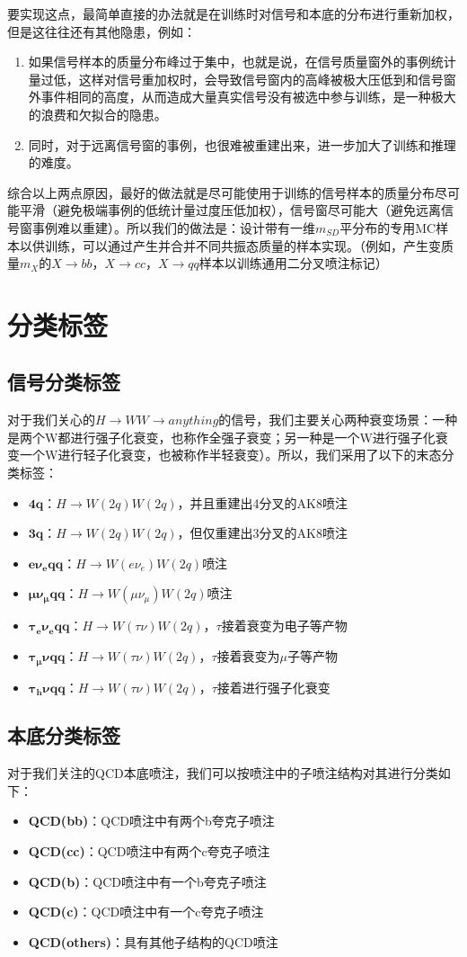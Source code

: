 要实现这点，最简单直接的办法就是在训练时对信号和本底的分布进行重新加权，但是这往往还有其他隐患，例如：
\begin{enumerate}[(1)]
    \item 如果信号样本的质量分布峰过于集中，也就是说，在信号质量窗外的事例统计量过低，这样对信号重加权时，会导致信号窗内的高峰被极大压低到和信号窗外事件相同的高度，从而造成大量真实信号没有被选中参与训练，是一种极大的浪费和欠拟合的隐患。
    \item 同时，对于远离信号窗的事例，也很难被重建出来，进一步加大了训练和推理的难度。
\end{enumerate}
综合以上两点原因，最好的做法就是尽可能使用于训练的信号样本的质量分布尽可能平滑（避免极端事例的低统计量过度压低加权），信号窗尽可能大（避免远离信号窗事例难以重建）。所以我们的做法是：设计带有一维$ m_{SD}$平分布的专用MC样本以供训练，可以通过产生并合并不同共振态质量的样本实现。（例如，产生变质量$m_X$的$X\to bb$，$X\to cc$，$X\to qq$样本以训练通用二分叉喷注标记）

\section{分类标签}
\subsection{信号分类标签}
对于我们关心的$H\to WW\to anything$的信号，我们主要关心两种衰变场景：一种是两个W都进行强子化衰变，也称作全强子衰变；另一种是一个W进行强子化衰变一个W进行轻子化衰变，也被称作半轻衰变）。所以，我们采用了以下的末态分类标签：
\begin{itemize}
    \item $\mathbf{4q}$：$H\to W(2q)W(2q)$，并且重建出4分叉的AK8喷注
    \item $\mathbf{3q}$：$H\to W(2q)W(2q)$，但仅重建出3分叉的AK8喷注
    \item $\mathbf{e\nu_e qq}$：$H\to W(e\nu_e)W(2q)$喷注
    \item $\mathbf{\mu\nu_\mu qq}$：$H\to W(\mu\nu_\mu)W(2q)$喷注
    \item $\mathbf{\tau_e\nu_eqq}$：$H\to W(\tau\nu)W(2q)$，$\tau$接着衰变为电子等产物
    \item $\bm{\tau_\mu\nu qq}$：$H\to W(\tau\nu)W(2q)$，$\tau$接着衰变为$\mu$子等产物
    \item $\mathbf{\tau_h\nu qq}$：$H\to W(\tau\nu)W(2q)$，$\tau$接着进行强子化衰变
\end{itemize}
\subsection{本底分类标签}
对于我们关注的QCD本底喷注，我们可以按喷注中的子喷注结构对其进行分类如下：
\begin{itemize}\label{eq:5.2}
    \item \textbf{QCD(bb)}：QCD喷注中有两个b夸克子喷注
    \item \textbf{QCD(cc)}：QCD喷注中有两个c夸克子喷注
    \item \textbf{QCD(b)}：QCD喷注中有一个b夸克子喷注
    \item \textbf{QCD(c)}：QCD喷注中有一个c夸克子喷注
    \item \textbf{QCD(others)}：具有其他子结构的QCD喷注
\end{itemize}
